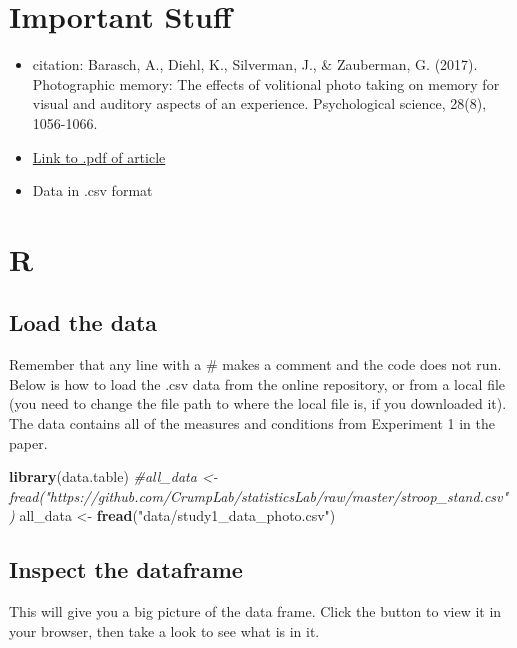 \documentclass[]{book}
\newenvironment{Shaded}{\begin{snugshade}}{\end{snugshade}}
\newcommand{\KeywordTok}[1]{\textcolor[rgb]{0.13,0.29,0.53}{\textbf{#1}}}
\newcommand{\StringTok}[1]{\textcolor[rgb]{0.31,0.60,0.02}{#1}}
\newcommand{\CommentTok}[1]{\textcolor[rgb]{0.56,0.35,0.01}{\textit{#1}}}
\newcommand{\NormalTok}[1]{#1}
\providecommand{\tightlist}{%
  \setlength{\itemsep}{0pt}\setlength{\parskip}{0pt}}
\begin{document}
\section{Important Stuff}\label{important-stuff-5}

\begin{itemize}
\tightlist
\item
  citation: Barasch, A., Diehl, K., Silverman, J., \& Zauberman, G.
  (2017). Photographic memory: The effects of volitional photo taking on
  memory for visual and auditory aspects of an experience. Psychological
  science, 28(8), 1056-1066.
\item
  \href{http://journals.sagepub.com/doi/abs/10.1177/0956797617694868}{Link
  to .pdf of article}
\item
  Data in .csv format
\end{itemize}

\section{R}\label{r-11}

\subsection{Load the data}\label{load-the-data-5}

Remember that any line with a \# makes a comment and the code does not
run. Below is how to load the .csv data from the online repository, or
from a local file (you need to change the file path to where the local
file is, if you downloaded it). The data contains all of the measures
and conditions from Experiment 1 in the paper.

\begin{Shaded}
\begin{Highlighting}[]
\KeywordTok{library}\NormalTok{(data.table)}
\CommentTok{#all_data <- fread("https://github.com/CrumpLab/statisticsLab/raw/master/stroop_stand.csv")}
\NormalTok{all_data <-}\StringTok{ }\KeywordTok{fread}\NormalTok{(}\StringTok{"data/study1_data_photo.csv"}\NormalTok{)}
\end{Highlighting}
\end{Shaded}

\subsection{Inspect the dataframe}\label{inspect-the-dataframe-3}

This will give you a big picture of the data frame. Click the button to
view it in your browser, then take a look to see what is in it.
\end{document}
